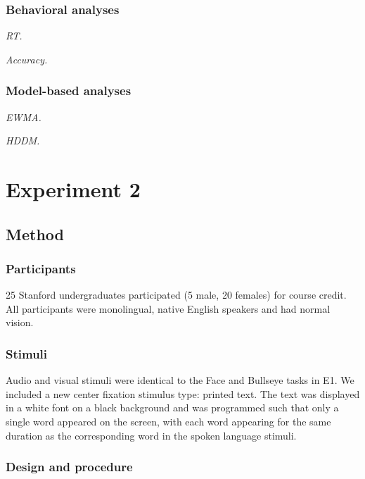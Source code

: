 \documentclass[10pt, letterpaper]{article}
\begin{document}
\subsubsection{Behavioral analyses}\label{behavioral-analyses}

\emph{RT.}

\emph{Accuracy.}

\subsubsection{Model-based analyses}\label{model-based-analyses}

\emph{EWMA.}

\emph{HDDM.}

\section{Experiment 2}\label{experiment-2}

\subsection{Method}\label{method-1}

\subsubsection{Participants}\label{participants-1}

25 Stanford undergraduates participated (5 male, 20 females) for course
credit. All participants were monolingual, native English speakers and
had normal vision.

\subsubsection{Stimuli}\label{stimuli-1}

Audio and visual stimuli were identical to the Face and Bullseye tasks
in E1. We included a new center fixation stimulus type: printed text.
The text was displayed in a white font on a black background and was
programmed such that only a single word appeared on the screen, with
each word appearing for the same duration as the corresponding word in
the spoken language stimuli.

\subsubsection{Design and procedure}\label{design-and-procedure-1}
\end{document}
